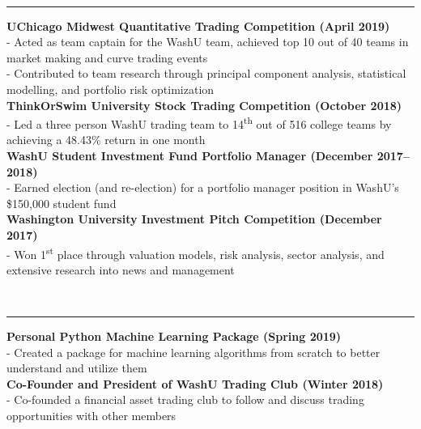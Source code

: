 \documentclass[11pt]{article}
\begin{document}
\begin{titlepage}
\begin{addmargin}[1em]{0em}
		\end{addmargin}
		\vspace{-10pt}
		\noindent
		\\\rule{\textwidth}{0.4pt}
		\begin{addmargin}[1em]{0em}
			\textbf{UChicago Midwest Quantitative Trading Competition \hfill (April 2019)}\\
- Acted as team captain for the WashU team, achieved top 10 out of 40 teams in market making and curve trading events\\
- Contributed to team research through principal component analysis, statistical modelling, and portfolio risk optimization\\
			\textbf{ThinkOrSwim University Stock Trading Competition \hfill (October 2018)}\\
- Led a three person WashU trading team to 14\textsuperscript{th} out of 516 college teams by achieving a 48.43\% return in one month\\
            \textbf{WashU Student Investment Fund Portfolio Manager \hfill (December 2017–2018)}\\
- Earned election (and re-election) for a portfolio manager position in WashU's \$150,000 student fund\\
			\textbf{Washington University Investment Pitch Competition \hfill (December 2017)}\\
- Won 1\textsuperscript{st} place through valuation models, risk analysis, sector analysis, and extensive research into news and management\\
		\end{addmargin}
		\vspace{-10pt}
		\noindent
		\\\rule{\textwidth}{0.4pt}
		\begin{addmargin}[1em]{0em}
			\textbf{Personal Python Machine Learning Package \hfill (Spring 2019)}\\
- Created a package for machine learning algorithms from scratch to better understand and utilize them\\
			\textbf{Co-Founder and President of WashU Trading Club \hfill (Winter 2018)}\\
- Co-founded a financial asset trading club to follow and discuss trading opportunities with other members\\

\end{addmargin}
\end{titlepage}
\end{document}

